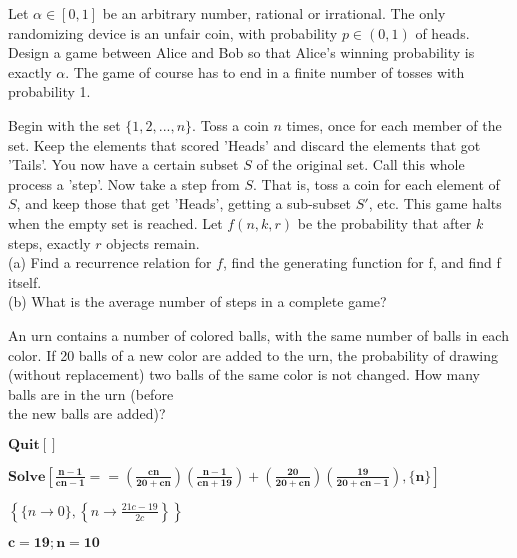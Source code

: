 \documentclass{article}
\begin{document}
Let \(\alpha  \in  [0,1]\) be an arbitrary number, rational or irrational. The only randomizing device is an unfair coin, with probability \(p \in
 (0,1)\) of heads. Design a game between Alice and Bob so that Alice{'}s winning probability is exactly \(\alpha\). The game of course has to end
in a finite number of tosses with probability 1.

 Begin with the set \(\{1,2,\text{...},n\}\). { }Toss a coin \(n\) times, once for each member of the set. Keep the elements that scored {'}Heads{'}
and discard the elements that got {'}Tails{'}. You now have a certain subset \(S\) of the original set. Call this whole process a {'}step{'}. { }Now
take a step from \(S\). That is, toss a coin for each element of \(S\), and keep those that get {'}Heads{'}, getting a sub-subset \(S'\), etc. This
game halts when the empty set is reached. { }Let \(f(n,k,r)\) be the probability that after \(k\) steps, exactly \(r\) objects remain. \\
(a) Find a recurrence relation for \(f\), find the generating function for f, and find f itself. \\
(b) What is the average number of steps in a complete game?

An urn contains a number of colored balls, with the same number of balls in each color. If 20 balls of a new color are added to the urn, the probability
of drawing (without replacement) two balls of the same color is not changed. How many balls are in the urn (before\\
the new balls are added)?



\begin{doublespace}
\noindent\(\pmb{\text{Quit}[]}\)
\end{doublespace}

\begin{doublespace}
\noindent\(\pmb{\text{Solve}\left[\frac{n-1}{c n-1}==\left(\frac{c n}{20+c n} \right)\left(\frac{n-1}{c n + 19}\right)+\left(\frac{20}{20+ c n}\right)\left(\frac{19}{20+c
n -1}\right),\{n\}\right]}\)
\end{doublespace}

\begin{doublespace}
\noindent\(\left\{\{n\to 0\},\left\{n\to \frac{21 c-19}{2 c}\right\}\right\}\)
\end{doublespace}

\begin{doublespace}
\noindent\(\pmb{c=19 ; n = 10}\)
\end{doublespace}
\end{document}
